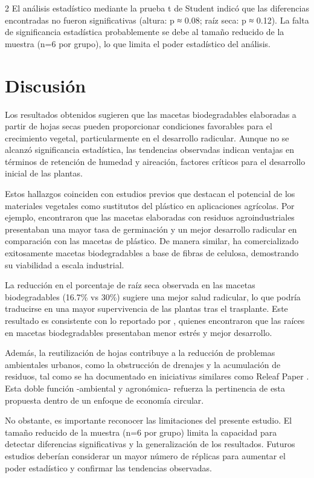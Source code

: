 \begin{multicols}{2}
El análisis estadístico mediante la prueba t de Student indicó que las diferencias encontradas no fueron significativas (altura: p ≈ 0.08; raíz seca: p ≈ 0.12). La falta de significancia estadística probablemente se debe al tamaño reducido de la muestra (n=6 por grupo), lo que limita el poder estadístico del análisis.

\section{Discusión}

Los resultados obtenidos sugieren que las macetas biodegradables elaboradas a partir de hojas secas pueden proporcionar condiciones favorables para el crecimiento vegetal, particularmente en el desarrollo radicular. Aunque no se alcanzó significancia estadística, las tendencias observadas indican ventajas en términos de retención de humedad y aireación, factores críticos para el desarrollo inicial de las plantas.

Estos hallazgos coinciden con estudios previos que destacan el potencial de los materiales vegetales como sustitutos del plástico en aplicaciones agrícolas. Por ejemplo, \citet{fuentes2021development} encontraron que las macetas elaboradas con residuos agroindustriales presentaban una mayor tasa de germinación y un mejor desarrollo radicular en comparación con las macetas de plástico. De manera similar, \citet{jiffygroup} ha comercializado exitosamente macetas biodegradables a base de fibras de celulosa, demostrando su viabilidad a escala industrial.

La reducción en el porcentaje de raíz seca observada en las macetas biodegradables (16.7\% vs 30\%) sugiere una mejor salud radicular, lo que podría traducirse en una mayor supervivencia de las plantas tras el trasplante. Este resultado es consistente con lo reportado por \citet{roussny2023macetas}, quienes encontraron que las raíces en macetas biodegradables presentaban menor estrés y mejor desarrollo.

Además, la reutilización de hojas contribuye a la reducción de problemas ambientales urbanos, como la obstrucción de drenajes y la acumulación de residuos, tal como se ha documentado en iniciativas similares como Releaf Paper \citep{ekosnegocios2025releaf}. Esta doble función -ambiental y agronómica- refuerza la pertinencia de esta propuesta dentro de un enfoque de economía circular.

No obstante, es importante reconocer las limitaciones del presente estudio. El tamaño reducido de la muestra (n=6 por grupo) limita la capacidad para detectar diferencias significativas y la generalización de los resultados. Futuros estudios deberían considerar un mayor número de réplicas para aumentar el poder estadístico y confirmar las tendencias observadas.


\end{multicols}

